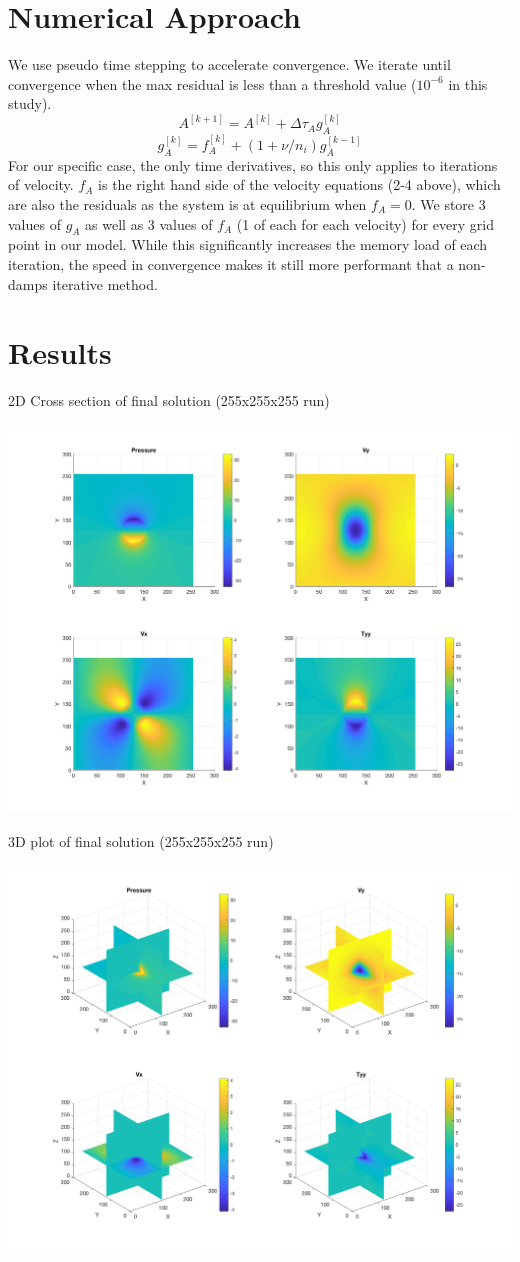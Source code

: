 \section*{\myfont Numerical Approach} %
We use pseudo time stepping to accelerate convergence. We iterate until convergence when the max residual is less than a threshold value ($10^{-6}$ in this study). 
$$A^{[k+1]} = A^{[k]} + \Delta \tau_A g_A^{[k]}$$
$$g_A^{[k]} = f_A^{[k]} + (1+\nu/n_i)g_A^{[k-1]}$$
For our specific case, the only time derivatives, so this only applies to iterations of velocity. $f_A$ is the right hand side of the velocity equations (2-4 above), which are also the residuals as the system is at equilibrium when $f_A=0$. We store 3 values of $g_A$ as well as 3 values of $f_A$ (1 of each for each velocity) for every grid point in our model. While this significantly increases the memory load of each iteration, the speed in convergence makes it still more performant that a non-damps iterative method. 

\section*{\myfont Results} %
2D Cross section of final solution (255x255x255 run)
\begin{center}
	\includegraphics[width = .8\textwidth]{../3dvis/plots2d.png}
\end{center}
3D plot of final solution (255x255x255 run)
\begin{center}
	\includegraphics[width = .8\textwidth]{../3dvis/plots.png}
\end{center}

